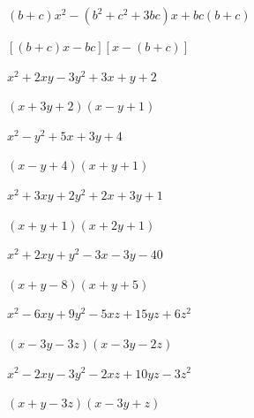 \documentclass[windows,csize4]{BHCexam}
\begin{document}
\begin{groups}
    \begin{questions}[]
        \begin{multicols}{2}
            \question[5]$(b+c)x^2-(b^2+c^2+3bc)x+bc(b+c)$
            \begin{solution}{0.5cm}
                \methodonly $[(b+c)x-bc][x-(b+c)]$
            \end{solution}

            \question[5]$x^2+2xy-3y^2+3x+y+2$
            \begin{solution}{0.5cm}
                \methodonly $(x+3y+2)(x-y+1)$
            \end{solution}
        \end{multicols}
        \vspace{3.5cm}

        \begin{multicols}{2}
            \question[5]$x^2-y^2+5x+3y+4$
            \begin{solution}{0.5cm}
                \methodonly $(x-y+4)(x+y+1)$
            \end{solution}

            \question[5]$x^2+3xy+2y^2+2x+3y+1$
            \begin{solution}{0.5cm}
                \methodonly $(x+y+1)(x+2y+1)$
            \end{solution}
        \end{multicols}

        \vspace{3.5cm}

        \begin{multicols}{2}
            \question[5]$x^2+2xy+y^2-3x-3y-40$
            \begin{solution}{0.5cm}
                \methodonly $(x+y-8)(x+y+5)$
            \end{solution}

            \question[5]$x^2-6xy+9y^2-5xz+15yz+6z^2$
            \begin{solution}{0.5cm}
                \methodonly $(x-3y-3z)(x-3y-2z)$
            \end{solution}
        \end{multicols}
        \vspace{3.5cm}

        \begin{multicols}{2}
            \question[5]$x^2-2xy-3y^2-2xz+10yz-3z^2$
            \begin{solution}{0.5cm}
                \methodonly $(x+y-3z)(x-3y+z)$
            \end{solution}


\end{multicols}
\end{questions}
\end{groups}
\end{document}
